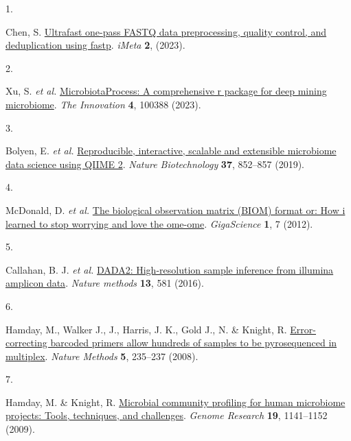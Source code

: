 \documentclass[
]{article}
\newlength{\cslhangindent}
\newlength{\csllabelwidth}
\newlength{\cslentryspacingunit} %
\newenvironment{CSLReferences}[2] %
 {%
  \setlength{\parindent}{0pt}
  \ifodd #1
  \let\oldpar\par
  \def\par{\hangindent=\cslhangindent\oldpar}
  \fi
  \setlength{\parskip}{#2\cslentryspacingunit}
 }%
 {}
\newcommand{\CSLLeftMargin}[1]{\parbox[t]{\csllabelwidth}{#1}}
\newcommand{\CSLRightInline}[1]{\parbox[t]{\linewidth - \csllabelwidth}{#1}\break}
\begin{document}
\hypertarget{refs}{}
\begin{CSLReferences}{0}{0}
\leavevmode{}%
\CSLLeftMargin{1. }%
\CSLRightInline{Chen, S. \href{https://doi.org/10.1002/imt2.107}{Ultrafast one-pass FASTQ data preprocessing, quality control, and deduplication using fastp}. \emph{iMeta} \textbf{2}, (2023).}

\leavevmode{}%
\CSLLeftMargin{2. }%
\CSLRightInline{Xu, S. \emph{et al.} \href{https://doi.org/10.1016/j.xinn.2023.100388}{MicrobiotaProcess: A comprehensive r package for deep mining microbiome}. \emph{The Innovation} \textbf{4}, 100388 (2023).}

\leavevmode{}%
\CSLLeftMargin{3. }%
\CSLRightInline{Bolyen, E. \emph{et al.} \href{https://doi.org/10.1038/s41587-019-0209-9}{Reproducible, interactive, scalable and extensible microbiome data science using QIIME 2}. \emph{Nature Biotechnology} \textbf{37}, 852--857 (2019).}

\leavevmode{}%
\CSLLeftMargin{4. }%
\CSLRightInline{McDonald, D. \emph{et al.} \href{https://doi.org/10.1186/2047-217X-1-7}{The biological observation matrix (BIOM) format or: How i learned to stop worrying and love the ome-ome}. \emph{GigaScience} \textbf{1}, 7 (2012).}

\leavevmode{}%
\CSLLeftMargin{5. }%
\CSLRightInline{Callahan, B. J. \emph{et al.} \href{https://doi.org/10.1038/nmeth.3869}{DADA2: High-resolution sample inference from illumina amplicon data}. \emph{Nature methods} \textbf{13}, 581 (2016).}

\leavevmode{}%
\CSLLeftMargin{6. }%
\CSLRightInline{Hamday, M., Walker J., J., Harris, J. K., Gold J., N. \& Knight, R. \href{https://doi.org/10.1038/nmeth.1184}{Error-correcting barcoded primers allow hundreds of samples to be pyrosequenced in multiplex}. \emph{Nature Methods} \textbf{5}, 235--237 (2008).}

\leavevmode{}%
\CSLLeftMargin{7. }%
\CSLRightInline{Hamday, M. \& Knight, R. \href{https://doi.org/10.1101/gr.085464.108}{Microbial community profiling for human microbiome projects: Tools, techniques, and challenges}. \emph{Genome Research} \textbf{19}, 1141--1152 (2009).}

\end{CSLReferences}
\end{document}
